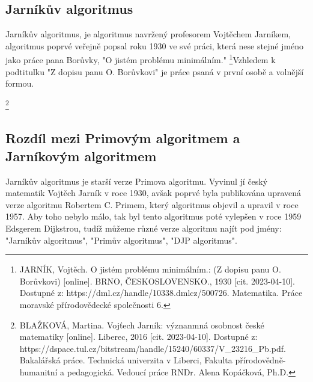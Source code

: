 \documentclass[11pt]{article}
\begin{document}
\subsection{Jarníkův algoritmus}
Jarníkův algoritmus, je algoritmus navržený profesorem Vojtěchem Jarníkem, algoritmus poprvé veřejně popsal roku 1930 ve své práci, která nese stejné jméno jako práce pana Borůvky, "O jistém problému minimálním."
\footnote{JARNÍK, Vojtěch. O jistém problému minimálním.: (Z dopisu panu O. Borůvkovi) [online]. BRNO, ČESKOSLOVENSKO., 1930 [cit. 2023-04-10]. Dostupné z: https://dml.cz/handle/10338.dmlcz/500726. Matematika. Práce moravské přírodovědecké společnosti 6.}Vzhledem k podtitulku "Z dopisu panu O. Borůvkovi" je práce psaná v první osobě a volnější formou.

\footnote{BLAŽKOVÁ, Martina. Vojťech Jarník: význanmná osobnost české matematiky [online]. Liberec, 2016 [cit. 2023-04-10]. Dostupné z: https://dspace.tul.cz/bitstream/handle/15240/60337/V_23216_Pb.pdf. Bakalářská práce. Technická univerzita v Liberci, Fakulta přírodovědně-humanitní a pedagogická. Vedoucí práce RNDr. Alena Kopáčková, Ph.D.}

\subsection{Rozdíl mezi Primovým algoritmem a Jarníkovým algoritmem}
Jarníkův algoritmus je starší verze Primova algoritmu. Vyvinul jí český matematik Vojtěch Jarník v roce 1930,
avšak poprvé byla publikována upravená verze algoritmu Robertem C. Primem, který algoritmus objevil a upravil v roce
1957. Aby toho nebylo málo, tak byl tento algoritmus poté vylepšen v roce 1959 Edsgerem Dijkstrou, tudíž můžeme různé
verze algoritmu najít pod jmény: "Jarníkův algoritmus", "Primův algoritmus", "DJP algoritmus".

\pagebreak
\end{document}
